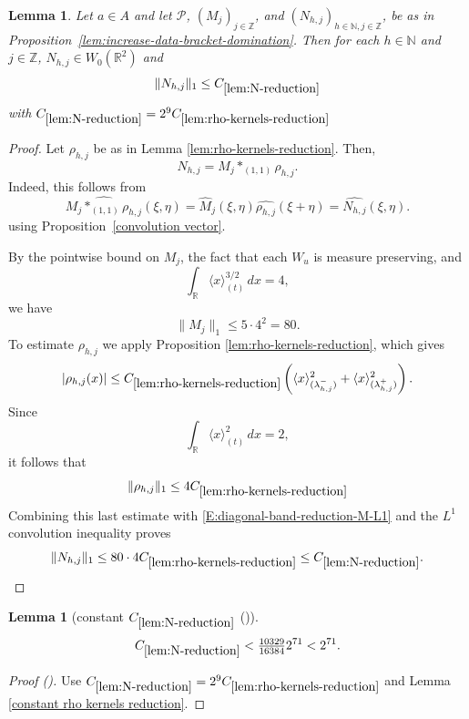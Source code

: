 \documentclass[12pt,reqno]{amsart}
\newcommand{\auto}{{({\tiny\faCar})}}
\theoremstyle{plain}
\newtheorem{lemma}[theorem]{Lemma}
\numberwithin{equation}{section}
\theoremstyle{remark}
\newcommand{\using}[1]{}
\newcommand{\Z}{{\mathbb Z}}
\newcommand{\R}{{\mathbb R}}
\newcommand{\N}{{\mathbb N}}
\begin{document}
\begin{lemma}
\label{lem:N-reduction}\using{lem:rho-kernels-reduction}\using{convolution vector} Let $a\in A$ and let $\mathcal P$, $(M_j)_{j\in \Z}$, and $(N_{h,j})_{h\in \N,j\in \Z}$,  be as in Proposition~\ref{lem:increase-data-bracket-domination}.
Then for each $h\in \N$ and $j\in \Z$,   $N_{h,j}\in W_0(\R^2)$ and
\begin{equation}
    \label{E:diagonal-band-reduction-N-L1}
    \|N_{h,j}\|_1\leq  C_{\ref{lem:N-reduction}}
\end{equation}
with $C_{\ref{lem:N-reduction}} = 2^9C_{\ref{lem:rho-kernels-reduction}}$
\end{lemma}
\begin{proof}
Let \(\rho_{h,j}\) be as in Lemma \ref{lem:rho-kernels-reduction}.
Then,
\[
N_{h,j}=M_j\ast_{(1,1)}\rho_{h,j}.
\]
Indeed, this follows from
\[
\widehat{M_j\ast_{(1,1)}\rho_{h,j}}(\xi,\eta)
=
\widehat M_j(\xi,\eta)
\widehat{\rho_{h,j}}(\xi+\eta)
=
\widehat{N_{h,j}}(\xi,\eta).
\]
using Proposition~\ref{convolution vector}.


By the pointwise bound on \(M_j\), the fact that each
\(W_u\) is measure preserving, and
\[
\int_{\mathbb R}\langle x\rangle_{(t)}^{3/2}\,dx=4,
\]
we have
\begin{equation}
    \label{E:diagonal-band-reduction-M-L1}
    \|M_j\|_1
    \leq
    5\cdot 4^2
    =
    80.
\end{equation}
 To estimate  $\rho_{h,j}$  we   apply  Proposition \ref{lem:rho-kernels-reduction},
which gives
\[
|\rho_{h,j}(x)|
\leq
C_{\ref{lem:rho-kernels-reduction}}
\left(
\langle x\rangle_{(\lambda_{h,j}^-)}^2
+
\langle x\rangle_{(\lambda_{h,j}^+)}^2
\right).
\]
Since
\[
\int_{\mathbb R}\langle x\rangle_{(t)}^2\,dx=2,
\]
it follows that
\[
\|\rho_{h,j}\|_1
\leq
4C_{\ref{lem:rho-kernels-reduction}}
\]
Combining this last estimate with
\eqref{E:diagonal-band-reduction-M-L1} and the \(L^1\) convolution
inequality proves
\[
\|N_{h,j}\|_1
\leq
80\cdot 4 C_{\ref{lem:rho-kernels-reduction}}
\leq
C_{\ref{lem:N-reduction}}.
\]
\end{proof}

\begin{lemma}[constant $C_{\ref{lem:N-reduction}}$ \auto]\label{constant N reduction}\using{lem:N-reduction}\using{lem:rho-kernels-reduction}\using{constant rho kernels reduction}
\begin{equation}\label{constant N reduction bound}
C_{\ref{lem:N-reduction}}
<\tfrac{10329}{16384}2^{71}<2^{71}.
\end{equation}
\end{lemma}
\begin{proof}[Proof \auto]
Use $C_{\ref{lem:N-reduction}}=2^9C_{\ref{lem:rho-kernels-reduction}}$ and Lemma \ref{constant rho kernels reduction}.
\end{proof}
\end{document}
